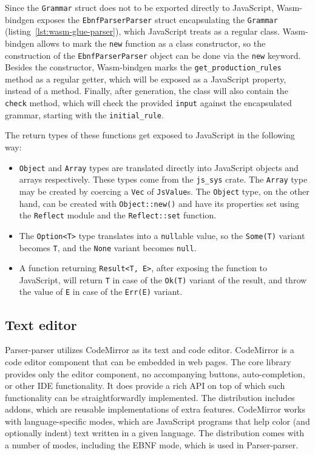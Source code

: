 \documentclass[english,engineering]{wizthesis}
\newcommand{\thisproject}{Parser-parser}
\begin{document}
Since the \texttt{Grammar} struct does not to be exported directly to
JavaScript, Wasm-bindgen exposes the \texttt{EbnfParserParser} struct
encapsulating the \texttt{Grammar} (listing~\ref{lst:wasm-glue-parser}), which
JavaScript treats as a regular class. Wasm-bindgen allows to mark the
\texttt{new} function as a class constructor, so the construction of the
\texttt{EbnfParserParser} object can be done via the \texttt{new} keyword.
Besides the constructor, Wasm-bindgen marks the \texttt{get\_production\_rules}
method as a regular getter, which will be exposed as a JavaScript property,
instead of a method. Finally, after generation, the class will also contain the
\texttt{check} method, which will check the provided \texttt{input} against the
encapsulated grammar, starting with the \texttt{initial\_rule}.

The return types of these functions get exposed to JavaScript in the following
way:
\begin{itemize}
  \item \texttt{Object} and \texttt{Array} types are translated directly into
  JavaScript objects and arrays respectively. These types come from the
  \texttt{js\_sys} crate. The \texttt{Array} type may be created by coercing a
  \texttt{Vec} of \texttt{JsValue}s. The \texttt{Object} type, on the other
  hand, can be created with \texttt{Object::new()} and have its properties set
  using the \texttt{Reflect} module and the \texttt{Reflect::set} function.
\end{itemize}

\begin{itemize}
  \item The \texttt{Option<T>} type translates into a \texttt{null}able value,
  so the \texttt{Some(T)} variant becomes \texttt{T}, and the \texttt{None}
  variant becomes \texttt{null}.
  \item A function returning \texttt{Result<T, E>}, after exposing the function
  to JavaScript, will return \texttt{T} in case of the \texttt{Ok(T)} variant of
  the result, and throw the value of \texttt{E} in case of the \texttt{Err(E)}
  variant.
\end{itemize}

\subsection{Text editor}

\thisproject{} utilizes CodeMirror as its text and code editor. CodeMirror is a
code editor component that can be embedded in web pages. The core library
provides only the editor component, no accompanying buttons, auto-completion, or
other IDE functionality. It does provide a rich API on top of which such
functionality can be straightforwardly implemented. The distribution includes
addons, which are reusable implementations of extra features. CodeMirror works
with language-specific modes, which are JavaScript programs that help color (and
optionally indent) text written in a given language. The distribution comes with
a number of modes, including the EBNF mode, which is used in \thisproject{}.
\end{document}
